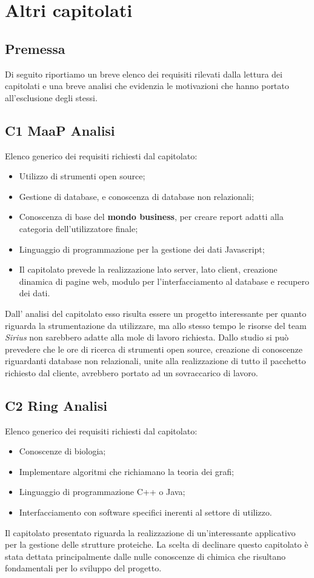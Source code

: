 
\section{Altri capitolati}
\subsection{Premessa}
Di seguito riportiamo un breve elenco dei requisiti rilevati dalla lettura dei capitolati e una breve analisi che evidenzia le motivazioni che hanno portato all'esclusione degli stessi.\\
\subsection{C1 MaaP Analisi}
Elenco generico dei requisiti richiesti dal capitolato:
\begin{itemize} 
\item Utilizzo di strumenti open source;
\item Gestione di database, e conoscenza di database non relazionali;
\item Conoscenza di base del \textbf{mondo business}, per creare report adatti alla categoria dell'utilizzatore finale;
\item Linguaggio di programmazione per la gestione dei dati Javascript;
\item Il capitolato prevede la realizzazione lato server, lato client, creazione dinamica di pagine web, modulo per l'interfacciamento al database e recupero dei dati.
\end{itemize}
Dall' analisi del capitolato esso risulta essere un progetto interessante per quanto riguarda la strumentazione da utilizzare, ma allo stesso tempo le risorse del team \textit{Sirius} non sarebbero adatte alla mole di lavoro richiesta. Dallo studio si può prevedere che le ore di ricerca di strumenti open source, creazione di conoscenze riguardanti database non relazionali, unite alla realizzazione di tutto il pacchetto richiesto dal cliente, avrebbero portato ad un sovraccarico di lavoro.
\\
\subsection{C2 Ring Analisi}
Elenco generico dei requisiti richiesti dal capitolato:
\begin{itemize} 
\item Conoscenze di biologia;
\item Implementare algoritmi che richiamano la teoria dei grafi;
\item Linguaggio di programmazione C++ o Java;
\item Interfacciamento con software specifici inerenti al settore di utilizzo.
\end{itemize}
Il capitolato presentato riguarda la realizzazione di un'interessante applicativo per la gestione delle strutture proteiche. La scelta di declinare questo capitolato è stata dettata principalmente dalle nulle conoscenze di chimica che risultano fondamentali per lo sviluppo del progetto.\\
